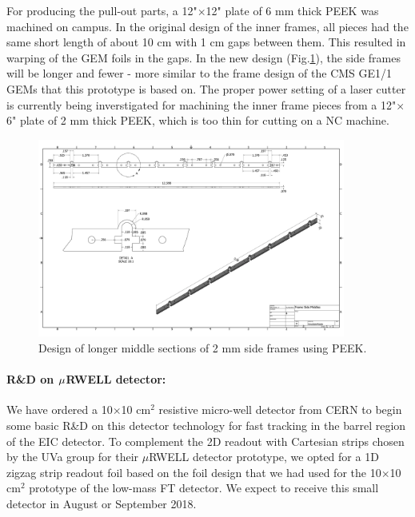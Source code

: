For producing the pull-out parts, a 12"$\times$12" plate of 6 mm thick PEEK was machined on campus. In the original design of the inner frames, all pieces had the same short length of about 10 cm with 1 cm gaps between them. This resulted in warping of the GEM foils in the gaps. In the new design (Fig.\ref{fig:sidemid}), the side frames will be longer and fewer - more similar to the frame design of the CMS GE1/1 GEMs that this prototype is based on. The proper power setting of a laser cutter is currently being inverstigated for machining the inner frame pieces from a 12"$\times$6" plate of 2 mm thick PEEK, which is too thin for cutting on a NC machine. 

\begin{figure}[h]
	\centering
	\includegraphics[width=0.9\textwidth]{FIT_plots/NewSideMiddle.pdf} 
	\caption{Design of longer middle sections of 2 mm side frames using PEEK.}
	\label{fig:sidemid}
\end{figure}



\paragraph*{R\&D on $\boldmath{\mu}$RWELL detector:} We have ordered a 10$\times$10 cm$^2$ resistive micro-well detector from CERN to begin some basic R\&D on this detector technology for fast tracking in the barrel region of the EIC detector. To complement the 2D readout with Cartesian strips chosen by the UVa group for their $\mu$RWELL detector prototype, we opted for a 1D zigzag strip readout foil based on the foil design that we had used for the 10$\times$10 cm$^2$ prototype\cite{Zhang:2017dqw} of the low-mass FT detector. We expect to receive this small detector in August or September 2018.



